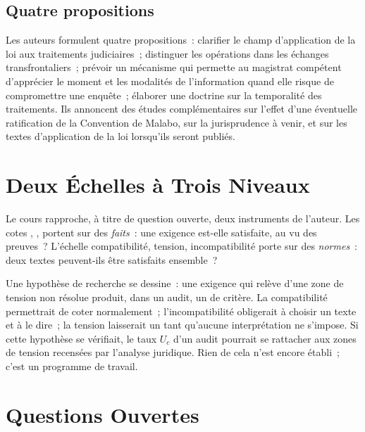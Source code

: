 \subsection{Quatre propositions}

Les auteurs formulent quatre propositions~: clarifier le champ
d'application de la loi aux traitements judiciaires~; distinguer les
opérations dans les échanges transfrontaliers~; prévoir un mécanisme qui
permette au magistrat compétent d'apprécier le moment et les modalités de
l'information quand elle risque de compromettre une enquête~; élaborer une
doctrine sur la temporalité des traitements. Ils annoncent des études
complémentaires sur l'effet d'une éventuelle ratification de la Convention
de Malabo, sur la jurisprudence à venir, et sur les textes d'application de
la loi lorsqu'ils seront publiés.

\section{Deux Échelles à Trois Niveaux}
\label{sec:c16-echelles}

Le cours rapproche, à titre de question ouverte, deux instruments de
l'auteur. Les cotes \OUI{}, \NON{}, \NEK{} portent sur des \textit{faits}~:
une exigence est-elle satisfaite, au vu des preuves~? L'échelle
compatibilité, tension, incompatibilité porte sur des \textit{normes}~:
deux textes peuvent-ils être satisfaits ensemble~?

Une hypothèse de recherche se dessine~: une exigence qui relève d'une zone
de tension non résolue produit, dans un audit, un \NEK{} de critère. La
compatibilité permettrait de coter normalement~; l'incompatibilité
obligerait à choisir un texte et à le dire~; la tension laisserait un
\NEK{} tant qu'aucune interprétation ne s'impose. Si cette hypothèse se
vérifiait, le taux $U_c$ d'un audit pourrait se rattacher aux zones de
tension recensées par l'analyse juridique. Rien de cela n'est encore
établi~; c'est un programme de travail.

\section{Questions Ouvertes}
\label{sec:c16-questions}

